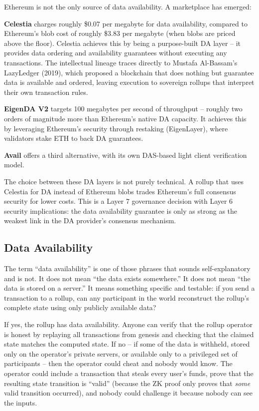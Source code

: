\documentclass[
  11pt,
  openany]{report}
\renewcommand{\textbf}[1]{{\bfseries\color{MidnightBold}#1}}
\begin{document}
Ethereum is not the only source of data availability. A marketplace has emerged:

\textbf{Celestia} charges roughly \$0.07 per megabyte for data availability,
compared to Ethereum's blob cost of roughly \$3.83 per megabyte (when blobs are
priced above the floor). Celestia achieves this by being a purpose-built DA
layer -- it provides data ordering and availability guarantees without executing
any transactions. The intellectual lineage traces directly to Mustafa
Al-Bassam's LazyLedger (2019), which proposed a blockchain that does nothing but
guarantee data is available and ordered, leaving execution to sovereign rollups
that interpret their own transaction rules.

\textbf{EigenDA V2} targets 100 megabytes per second of throughput -- roughly
two orders of magnitude more than Ethereum's native DA capacity. It achieves
this by leveraging Ethereum's security through restaking (EigenLayer), where
validators stake ETH to back DA guarantees.

\textbf{Avail} offers a third alternative, with its own DAS-based light client
verification model.

The choice between these DA layers is not purely technical. A rollup that uses
Celestia for DA instead of Ethereum blobs trades Ethereum's full consensus
security for lower costs. This is a Layer 7 governance decision with Layer 6
security implications: the data availability guarantee is only as strong as the
weakest link in the DA provider's consensus mechanism.

\subsection{Data Availability}\label{data-availability}

The term ``data availability'' is one of those phrases that sounds
self-explanatory and is not. It does not mean ``the data exists somewhere.'' It
does not mean ``the data is stored on a server.'' It means something specific
and testable: if you send a transaction to a rollup, can any participant in the
world reconstruct the rollup's complete state using only publicly available
data?

If yes, the rollup has data availability. Anyone can verify that the rollup
operator is honest by replaying all transactions from genesis and checking that
the claimed state matches the computed state. If no -- if some of the data is
withheld, stored only on the operator's private servers, or available only to a
privileged set of participants -- then the operator could cheat and nobody would
know. The operator could include a transaction that steals every user's funds,
prove that the resulting state transition is ``valid'' (because the ZK proof
only proves that \emph{some} valid transition occurred), and nobody could
challenge it because nobody can see the inputs.
\end{document}
